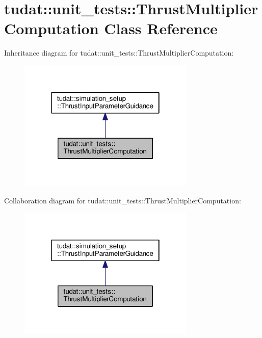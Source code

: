 \hypertarget{classtudat_1_1unit__tests_1_1ThrustMultiplierComputation}{}\section{tudat\+:\+:unit\+\_\+tests\+:\+:Thrust\+Multiplier\+Computation Class Reference}
\label{classtudat_1_1unit__tests_1_1ThrustMultiplierComputation}


Inheritance diagram for tudat\+:\+:unit\+\_\+tests\+:\+:Thrust\+Multiplier\+Computation\+:
\nopagebreak
\begin{figure}[H]
\begin{center}
\leavevmode
\includegraphics[width=238pt]{classtudat_1_1unit__tests_1_1ThrustMultiplierComputation__inherit__graph}
\end{center}
\end{figure}


Collaboration diagram for tudat\+:\+:unit\+\_\+tests\+:\+:Thrust\+Multiplier\+Computation\+:
\nopagebreak
\begin{figure}[H]
\begin{center}
\leavevmode
\includegraphics[width=238pt]{classtudat_1_1unit__tests_1_1ThrustMultiplierComputation__coll__graph}
\end{center}
\end{figure}

